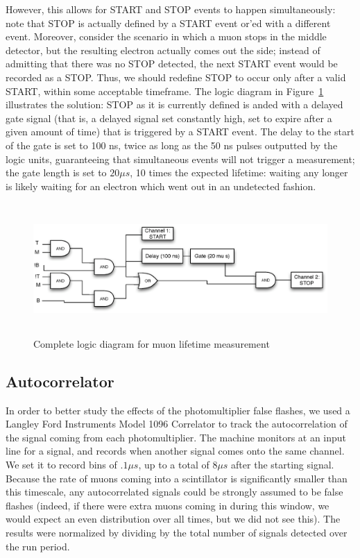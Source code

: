 However, this allows for START and STOP events to happen simultaneously: note that STOP is actually defined by a START event or'ed with a different event. Moreover, consider the scenario in which a muon stops in the middle detector, but the resulting electron actually comes out the side; instead of admitting that there was no STOP detected, the next START event would be recorded as a STOP. Thus, we should redefine STOP to occur only after a valid START, within some acceptable timeframe. The logic diagram in Figure~\ref{figure:logic} illustrates the solution: STOP as it is currently defined is anded with a delayed gate signal (that is, a delayed signal set constantly high, set to expire after a given amount of time) that is triggered by a START event. The delay to the start of the gate is set to 100 ns, twice as long as the 50 ns pulses outputted by the logic units, guaranteeing that simultaneous events will not trigger a measurement; the gate length is set to $20 \mu s$, 10 times the expected lifetime: waiting any longer is likely waiting for an electron which went out in an undetected fashion.

\begin{figure}[htbp]
\begin{center}
\includegraphics[height=50mm]{./figures/logicdiagram.eps}
\caption{Complete logic diagram for muon lifetime measurement}
\label{figure:logic}
\end{center}
\end{figure}


\subsection{Autocorrelator}
\label{Autocorrelator}
In order to better study the effects of the photomultiplier false flashes, we used a Langley Ford Instruments Model 1096 Correlator to track the autocorrelation of the signal coming from each photomultiplier. The machine monitors at an input line for a signal, and records when another signal comes onto the same channel. We set it to record bins of $.1 \mu s$, up to a total of $8 \mu s$ after the starting signal. Because the rate of muons coming into a scintillator is significantly smaller than this timescale, any autocorrelated signals could be strongly assumed to be false flashes (indeed, if there were extra muons coming in during this window, we would expect an even distribution over all times, but we did not see this). The results were normalized by dividing by the total number of signals detected over the run period.

